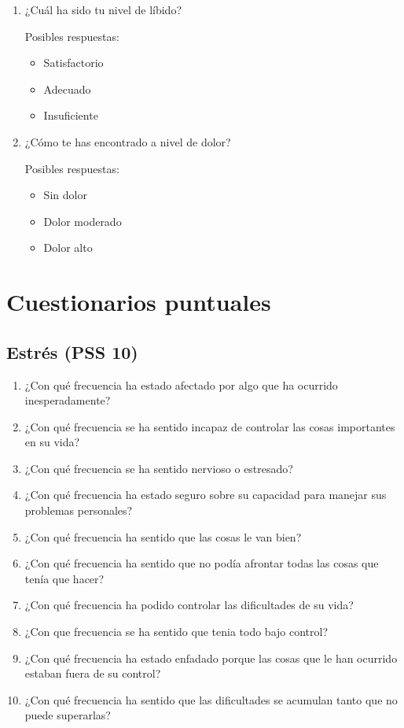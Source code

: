 \begin{enumerate}
                \item ¿Cuál ha sido tu nivel de líbido?
                
                Posibles respuestas:
                    \begin{itemize}
                        \item Satisfactorio  
                        \item Adecuado
                        \item Insuficiente
                    \end{itemize}
                    
                \item ¿Cómo te has encontrado a nivel de dolor?
                
                Posibles respuestas:
                    \begin{itemize}
                        \item Sin dolor 
                        \item Dolor moderado
                        \item Dolor alto
                    \end{itemize}
                    
            \end{enumerate}
\chapter{Cuestionarios puntuales}
\label{chapter:cuestionarios_puntuales}
    \section{Estrés (PSS 10)}
    \label{cuestionarios:pss_10}
        \begin{enumerate}
            \item ¿Con qué frecuencia ha estado afectado por algo que ha ocurrido inesperadamente?
            \item ¿Con qué frecuencia se ha sentido incapaz de controlar las cosas importantes en su vida?
            \item ¿Con qué frecuencia se ha sentido nervioso o estresado?
            \item ¿Con qué frecuencia ha estado seguro sobre su capacidad para manejar sus problemas personales?
            \item ¿Con qué frecuencia ha sentido que las cosas le van bien?
            \item ¿Con qué frecuencia ha sentido que no podía afrontar todas las cosas que tenía que hacer?
            \item ¿Con qué frecuencia ha podido controlar las dificultades de su vida?
            \item ¿Con que frecuencia se ha sentido que tenia todo bajo control?
            \item ¿Con qué frecuencia ha estado enfadado porque las cosas que le han ocurrido estaban fuera de su control?
            \item ¿Con qué frecuencia ha sentido que las dificultades se acumulan tanto que no puede superarlas?
        \end{enumerate}

